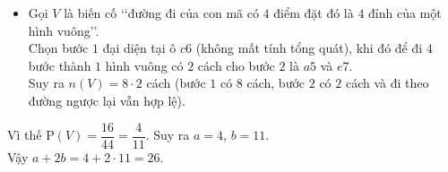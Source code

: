 \begin{ex}
{\begin{itemize}
\begin{itemize}
			Chọn $c6$ làm đại diện của nhóm (vì cùng tính chất) để đi được $4$ bước là cạnh hình thoi thì $c6$ có thể có $6$ cách đi (bước $2$) bao gồm $a5$; $a7$; $b4$; $d8$; $e5$; $e7$.\\
			Vậy ở nhóm $1$ có $4\cdot6=24$ cách.
			\item Nhóm $2$ là cách cạnh bàn cờ ít nhất $1$ ô gồm $b3$; $b5$; $c2$; $e2$. Khi đó bước $1$ có $4$ cách.\\
			Chọn $b3$ làm đại diện của nhóm (vì cùng tính chất) để đi được $4$ bước là cạnh hình thoi thì $b3$ có thể có $5$ cách đi (bước $2$) bao gồm $a1$; $a5$; $c1$; $c5$; $d2$.\\
			Vậy ở nhóm $1$ có $4\cdot5=20$ cách.
		\end{itemize}
		Suy ra $ n(\Omega)=20+24=44$.
		\item Gọi $V$ là biến cố \lq\lq đường đi của con mã có $4$ điểm đặt đó là $4$ đỉnh của một hình vuông\rq\rq.\\
		Chọn bước $1$ đại diện tại ô $c6$ (không mất tính tổng quát), khi đó để đi $4$ bước thành $1$ hình vuông có $2$ cách cho bước $2$ là $a5$ và $e7$.\\
		Suy ra $n(V)=8\cdot2$ cách (bước $1$ có $8$ cách, bước $2$ có $2$ cách và đi theo đường ngược lại vẫn hợp lệ).
	\end{itemize}
	Vì thế $\mathrm{P}(V)=\dfrac{16}{44}=\dfrac{4}{11}$.
	Suy ra $a=4$, $b=11$.\\
	Vậy $a+2b=4+2\cdot11=26$.
}
\end{ex}

